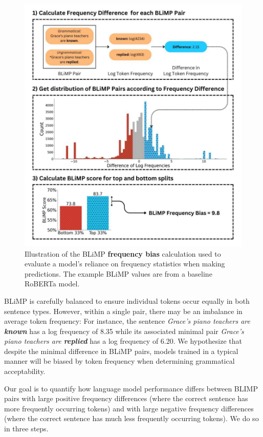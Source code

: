 \begin{figure}[ht!]
    \centering
    \includegraphics[width=0.8\linewidth]{chapters/syntatic-smoothing/figures/blimp_bias_example.pdf}
    \caption{Illustration of the BLiMP \textbf{frequency bias} calculation used to evaluate a model's reliance on frequency statistics when making predictions. The example BLiMP values are from a baseline RoBERTa model.}
    \label{fig:blimp_bias}
    \vspace{-1em}
\end{figure}

BLiMP is carefully balanced to ensure individual tokens occur equally in both sentence types. However, within a single pair, there may be an imbalance in average token frequency: For instance, the sentence
\textit{Grace's piano teachers are \textbf{known}} has a log frequency of 8.35 while its associated minimal pair \textit{Grace's piano teachers are \textbf{replied}} has a log frequency of 6.20.  We hypothesize that despite the minimal difference in BLiMP pairs, models trained in a typical manner will be biased by token frequency when determining grammatical acceptability.

Our goal is to quantify how language model performance differs between BLIMP pairs with large positive frequency differences (where the correct sentence has more frequently occurring tokens) and with large negative frequency differences (where the correct sentence has much less frequently occurring tokens). We do so in three steps.

